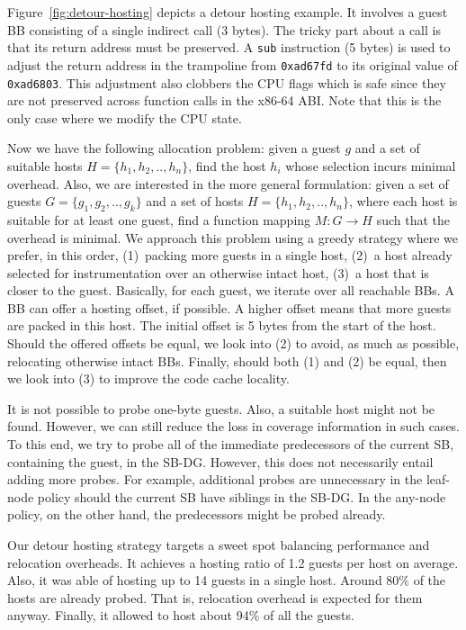 {Figure~\ref{fig:detour-hosting} depicts a detour hosting example.
It involves a guest BB consisting of a single indirect \textsf{call} (3 bytes).
The tricky part about a \textsf{call} is that its return address must be preserved.
A \texttt{sub} instruction (5 bytes) is used to adjust the return address in the trampoline from \texttt{0xad67fd} to its original value of \texttt{0xad6803}.
This adjustment also clobbers the CPU flags which is safe since they are not preserved across function calls in the x86-64 ABI.
Note that this is the only case where we modify the CPU state.

Now we have the following allocation problem: given a guest $g$ and a set of suitable hosts $H=\{h_1,h_2,..,h_n\}$, find the host $h_i$ whose selection incurs minimal overhead.
Also, we are interested in the more general formulation: given a set of guests $G=\{g_1,g_2,..,g_k\}$ and a set of hosts $H=\{h_1,h_2,..,h_n\}$, where each host is suitable for at least one guest, find a function mapping $M:G\rightarrow H$ such that the overhead is minimal.
We approach this problem using a greedy strategy where we prefer, in this order,
(1)~packing more guests in a single host,
(2)~a host already selected for instrumentation over an otherwise intact host,
(3)~a host that is closer to the guest.
Basically, for each guest, we iterate over all reachable BBs.
A BB can offer a hosting offset, if possible.
A higher offset means that more guests are packed in this host.
The initial offset is 5 bytes from the start of the host.
Should the offered offsets be equal, we look into (2) to avoid, as much as possible, relocating otherwise intact BBs.
Finally, should both (1) and (2) be equal, then we look into (3) to improve the code cache locality.

It is not possible to probe one-byte guests.
Also, a suitable host might not be found.
However, we can still reduce the loss in coverage information in such cases.
To this end, we try to probe all of the immediate predecessors of the current SB, containing the guest, in the SB-DG.
However, this does not necessarily entail adding more probes.
For example, additional probes are unnecessary in the leaf-node policy should the current SB have siblings in the SB-DG.
In the any-node policy, on the other hand, the predecessors might be probed already.

Our detour hosting strategy targets a sweet spot balancing performance and relocation overheads.
It achieves a hosting ratio of 1.2 guests per host on average.
Also, it was able of hosting up to 14 guests in a single host.
Around 80\% of the hosts are already probed. 
That is, relocation overhead is expected for them anyway.
Finally, it allowed {\bcov} to host about 94\% of all the guests.

}
